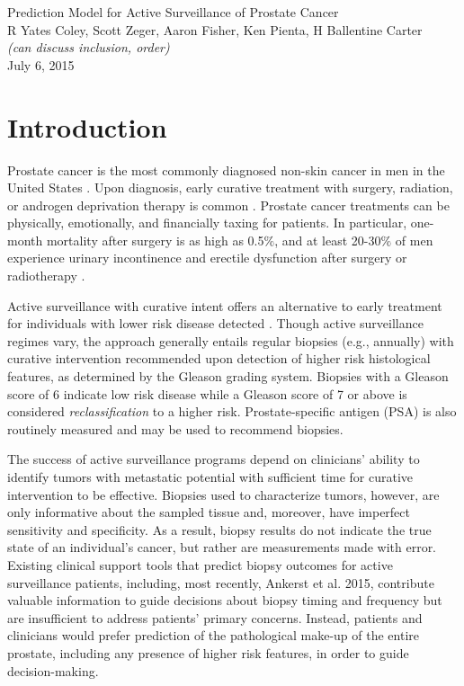 \documentclass[12pt, letterpaper]{article}
\begin{document}
\begin{center}
\large Prediction Model for Active Surveillance of Prostate Cancer\\
R Yates Coley, Scott Zeger, Aaron Fisher,  Ken Pienta, H Ballentine Carter \\\textit{(can discuss inclusion, order)} \\
July 6, 2015\\
\end{center}



\section{Introduction}
Prostate cancer is the most commonly diagnosed non-skin cancer in men in the United States \cite{SEER2014}. Upon diagnosis, early curative treatment with surgery, radiation, or androgen deprivation therapy is common \cite{Cooperberg2010,Welch2009}. Prostate cancer treatments can be physically, emotionally, and financially taxing for patients. In particular, one-month mortality after surgery is as high as 0.5$\%$, and at least 20-30$\%$ of men experience urinary incontinence and erectile dysfunction after surgery or radiotherapy \cite{Chou2011a,Chou2011b}. 

Active surveillance with curative intent offers an alternative to early treatment for individuals with lower risk disease detected \cite{Carter2007, Khatami2007, Klotz2010, Soloway2008, Tosoian2011, vanAs2008, vandenBergh2009}. Though active surveillance regimes vary, the approach generally entails regular biopsies (e.g., annually) with curative intervention recommended upon detection of higher risk histological features, as determined by the Gleason grading system. Biopsies with a Gleason score of 6 indicate low risk disease while a Gleason score of 7 or above is considered \textit{reclassification} to a higher risk. Prostate-specific antigen (PSA) is also routinely measured and may be used to recommend biopsies. 

The success of active surveillance programs depend on clinicians' ability to identify tumors with metastatic potential with sufficient time for curative intervention to be effective. Biopsies used to characterize tumors, however, are only informative about the sampled tissue and, moreover, have imperfect sensitivity and specificity\cite{Epstein2012}. As a result, biopsy results do not indicate the true state of an individual's cancer, but rather are measurements made with error. Existing clinical support tools that predict biopsy outcomes for active surveillance patients, including, most recently, Ankerst et al. 2015\nocite{Ankerst2015}, contribute valuable information to guide decisions about biopsy timing and frequency but are insufficient to address patients' primary concerns. Instead, patients and clinicians would prefer prediction of the pathological make-up of the entire prostate, including any presence of higher risk features, in order to guide decision-making.
\end{document}
